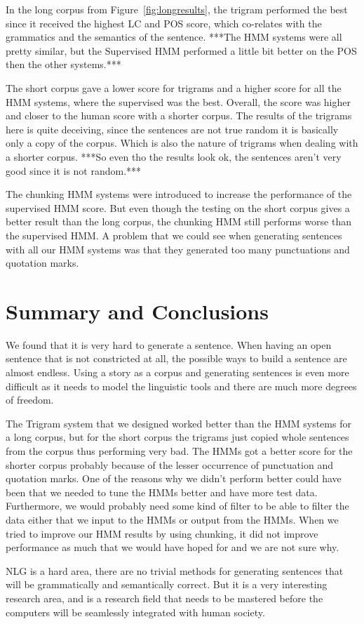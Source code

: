 \documentclass[a4paper,12pt]{article}
\begin{document}
In the long corpus from Figure~\ref{fig:longresults}, the trigram performed the best since it received the highest LC and POS score, which co-relates with the
grammatics and the semantics of the sentence. ***The HMM systems were all pretty similar, but the Supervised HMM performed
a little bit better on the POS then the other systems.***

The short corpus gave a lower score for trigrams and a higher score for all the HMM systems, where the supervised was the best.
Overall, the score was higher and closer to the human score with a shorter
corpus.
The results of the trigrams here is quite deceiving, since the sentences are not true random it is basically only a copy of the 
corpus. Which is also the nature of trigrams when dealing with a shorter corpus.
***So even tho the results look ok, the sentences aren't very good since it is
not random.***

The chunking HMM systems were introduced to increase the performance of the
supervised HMM score. But even though the testing on the short corpus gives a
better result than the long corpus, the chunking HMM still performs worse than
the supervised HMM.
A problem that we could see when generating sentences with all our HMM systems
was that they generated too many punctuations and quotation marks.

\section{Summary and Conclusions}
We found that it is very hard to generate a sentence. When having an open
sentence that is not constricted at all, the possible ways to build a sentence
are almost endless. Using a story as a corpus and generating sentences is even
more difficult as it needs to model the linguistic tools and there are much more
degrees of freedom.

The Trigram system that we designed worked better than the HMM systems for a
long corpus, but for the short corpus the trigrams just copied whole sentences
from the corpus thus performing very bad.
The HMMs got a better score for the shorter corpus probably because of the
lesser occurrence of punctuation and quotation marks.
One of the reasons why we didn't perform better could have been that we needed
to tune the HMMs better and have more test data. Furthermore, we would probably
need some kind of filter to be able to filter the data either that we input to
the HMMs or output from the HMMs.
When we tried to improve our HMM results by using chunking, it did not improve
performance as much that we would have hoped for and we are not sure why.

NLG is a hard area, there are no trivial methods for generating sentences that
will be grammatically and semantically correct.
But it is a very interesting research area, and is a research field that needs
to be mastered before the computers will be seamlessly integrated with human society.
\label{sec:summary}


\end{document}
